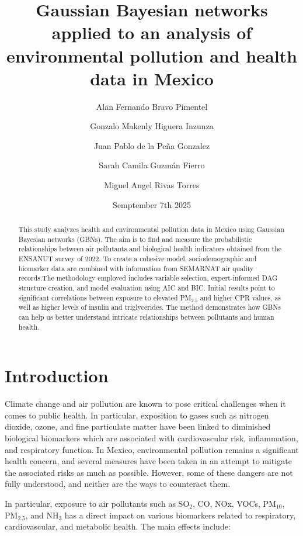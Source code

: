 \documentclass[twocolumn]{article}
\title{Gaussian Bayesian networks applied to an analysis of environmental pollution and health data in Mexico }
\author{
Alan Fernando Bravo Pimentel \and
Gonzalo Makenly Higuera Inzunza \and
Juan Pablo de la Peña Gonzalez \and
Sarah Camila Guzmán Fierro \and
Miguel Angel Rivas Torres
}
\date{Semptember 7th 2025}
\begin{document}
\maketitle

\begin{abstract}
This study analyzes health and environmental pollution data in Mexico using Gaussian Bayesian networks (GBNs). The aim is to find and measure the probabilistic relationships between air pollutants and biological health indicators obtained from the ENSANUT survey of 2022. To create a cohesive model, sociodemographic and biomarker data are combined with information from SEMARNAT air quality records.The methodology employed includes variable selection, expert-informed DAG structure creation, and model evaluation using AIC and BIC. Initial results point to significant correlations between   exposure to elevated PM$_{2.5}$ and higher CPR values, as well as higher levels of insulin and triglycerides. The method demonstrates how GBNs can help us better understand intricate relationships between pollutants and human health.
\end{abstract}

\section{Introduction}
Climate change and air pollution are known to pose critical challenges when it comes to public health. In particular, exposition to gases such as nitrogen dioxide, ozone, and fine particulate matter have been linked to diminished biological biomarkers which are associated with cardiovascular risk, inflammation, and respiratory function. In Mexico, environmental pollution remains a significant health concern, and several measures have been taken in an attempt to mitigate the associated risks as much as possible. However, some of these dangers are not fully understood, and neither are the ways to counteract them.

\vspace{0.5cm}

In particular, exposure to air pollutants such as SO$_2$, CO, NOx, VOCs, PM$_{10}$, PM$_{2.5}$, and NH$_3$ has a direct impact on various biomarkers related to respiratory, cardiovascular, and metabolic health. The main effects include:
\end{document}
